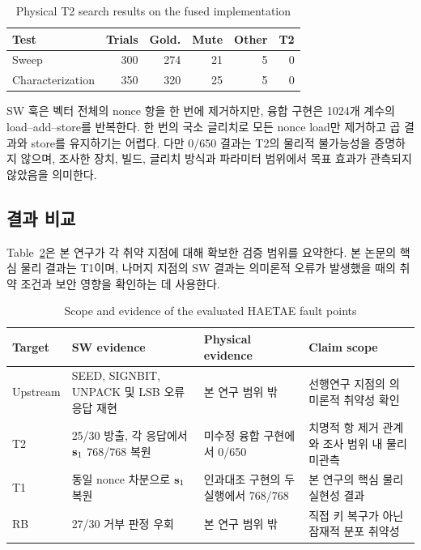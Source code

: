 \begin{table}[H]
\centering
\caption{Physical T2 search results on the fused implementation}
\label{tab:physical-t2-result}
\footnotesize
\begin{tabular}{@{}lrrrrr@{}}
\toprule
Test & Trials & Gold. & Mute & Other & T2 \\
\midrule
Sweep & 300 & 274 & 21 & 5 & 0 \\
Characterization & 350 & 320 & 25 & 5 & 0 \\
\bottomrule
\end{tabular}
\end{table}

SW 훅은 벡터 전체의 nonce 항을 한 번에 제거하지만, 융합 구현은
1024개 계수의 load--add--store를 반복한다. 한 번의 국소 글리치로
모든 nonce load만 제거하고 곱 결과와 store를 유지하기는 어렵다.
다만 0/650 결과는 T2의 물리적 불가능성을 증명하지 않으며, 조사한
장치, 빌드, 글리치 방식과 파라미터 범위에서 목표 효과가 관측되지
않았음을 의미한다.

\subsection{결과 비교}

Table~\ref{tab:evidence-result}은 본 연구가 각 취약 지점에 대해
확보한 검증 범위를 요약한다. 본 논문의 핵심 물리 결과는 T1이며,
나머지 지점의 SW 결과는 의미론적 오류가 발생했을 때의 취약 조건과
보안 영향을 확인하는 데 사용한다.

\begin{table}[t]
\centering
\caption{Scope and evidence of the evaluated HAETAE fault points}
\label{tab:evidence-result}
\small
\begin{tabularx}{0.94\textwidth}{@{}l X X X@{}}
\toprule
Target & SW evidence & Physical evidence & Claim scope \\
\midrule
Upstream &
SEED, SIGNBIT, UNPACK 및 LSB 오류 응답 재현 &
본 연구 범위 밖 &
선행연구 지점의 의미론적 취약성 확인 \\
T2 &
25/30 방출, 각 응답에서 $\mathbf{s}_1$ 768/768 복원 &
미수정 융합 구현에서 0/650 &
치명적 항 제거 관계와 조사 범위 내 물리 미관측 \\
T1 &
동일 nonce 차분으로 $\mathbf{s}_1$ 복원 &
인과대조 구현의 두 실행에서 768/768 &
본 연구의 핵심 물리 실현성 결과 \\
RB &
27/30 거부 판정 우회 &
본 연구 범위 밖 &
직접 키 복구가 아닌 잠재적 분포 취약성 \\
\bottomrule
\end{tabularx}
\end{table}
